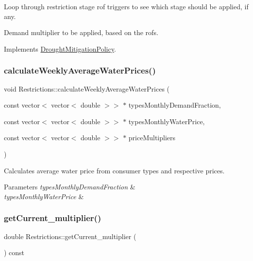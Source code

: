 Loop through restriction stage rof triggers to see which stage should be applied, if any.

Demand multiplier to be applied, based on the rofs. 

Implements \mbox{\hyperlink{classDroughtMitigationPolicy_a76c1a85eaf7707306fe173b6437cc31d}{Drought\+Mitigation\+Policy}}.

\mbox{\label{classRestrictions_a5155dcecc8b995c1793fa400f1533959}} 
\subsubsection{\texorpdfstring{calculate\+Weekly\+Average\+Water\+Prices()}{calculateWeeklyAverageWaterPrices()}}
{\footnotesize\ttfamily void Restrictions\+::calculate\+Weekly\+Average\+Water\+Prices (\begin{DoxyParamCaption}\item[{const vector$<$ vector$<$ double $>$$>$ $\ast$}]{types\+Monthly\+Demand\+Fraction,  }\item[{const vector$<$ vector$<$ double $>$$>$ $\ast$}]{types\+Monthly\+Water\+Price,  }\item[{const vector$<$ vector$<$ double $>$$>$ $\ast$}]{price\+Multipliers }\end{DoxyParamCaption})}

Calculates average water price from consumer types and respective prices. 
\begin{DoxyParams}{Parameters}
{\em types\+Monthly\+Demand\+Fraction} & \\
\hline
{\em types\+Monthly\+Water\+Price} & \\
\hline
\end{DoxyParams}
\mbox{\label{classRestrictions_a4282debfe00607f87f59a08ec1844d40}} 
\subsubsection{\texorpdfstring{get\+Current\+\_\+multiplier()}{getCurrent\_multiplier()}}
{\footnotesize\ttfamily double Restrictions\+::get\+Current\+\_\+multiplier (\begin{DoxyParamCaption}{ }\end{DoxyParamCaption}) const}

